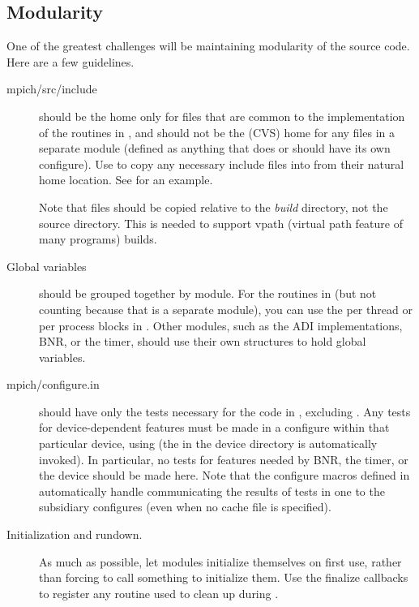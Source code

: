 \documentclass{article}
\begin{document}
\subsection{Modularity}
\label{sec:modularity}
One of the greatest challenges will be maintaining modularity of the source
code.  Here are a few guidelines.

\begin{description}
\item[mpich/src/include] should be the home only for files that are
  common to 
the implementation of the routines in , and should not be
the 
(CVS) home for any files in a separate module (defined as anything that does
or should have its own configure).  Use  to copy any
necessary include files into  from their natural home
location.  See  for an
example. 

Note that files should be copied relative to the \emph{build}
directory, not the source directory.  This is needed to support vpath
(virtual path feature of many  programs) builds.

\item[Global variables] should be grouped together by module.  For the routines
in  (but not counting  because that is
a separate 
module), you can use the per thread or per process blocks in
.  Other modules, such as the ADI implementations,
BNR, 
or the timer, should use their own structures to hold global variables. 

\item[mpich/configure.in] should have only the tests necessary for the
  code in 
, excluding  .  Any tests for
device-dependent features 
must be made in a configure within that particular device, using
 (the  in the device directory
is automatically invoked).  In particular, no tests for features needed by
BNR, the 
timer, or the device should be made here.  Note that the configure
macros defined in  automatically handle communicating the
results of tests in one  to the subsidiary configures
(even when no cache file is specified).

\item[Initialization and rundown.] As much as possible, let modules initialize 
themselves on first use, rather than forcing  to call
something 
to initialize them.  Use the finalize callbacks to register any routine used
to clean up during . 
\end{description}
\end{document}
